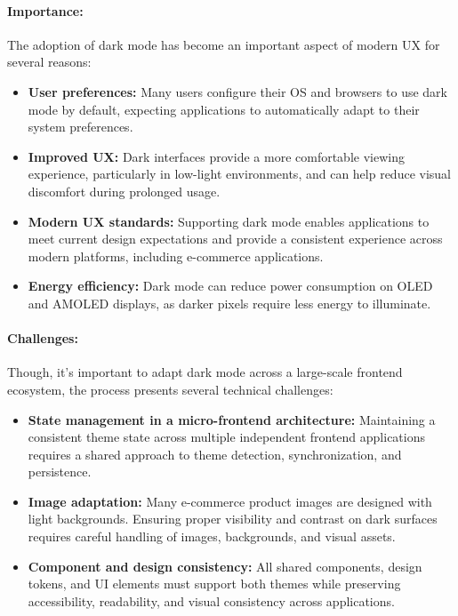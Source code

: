 \paragraph{Importance:}

The adoption of dark mode has become an important aspect of modern \acs{UX} for several reasons:

\begin{itemize}
    \item \textbf{User preferences:} Many users configure their \acs{OS} and browsers to use dark mode by default, expecting applications to automatically adapt to their system preferences.

    \item \textbf{Improved \acs{UX}:} Dark interfaces provide a more comfortable viewing experience, particularly in low-light environments, and can help reduce visual discomfort during prolonged usage.

    \item \textbf{Modern \acs{UX} standards:} Supporting dark mode enables applications to meet current design expectations and provide a consistent experience across modern platforms, including e-commerce applications.

    \item \textbf{Energy efficiency:} Dark mode can reduce power consumption on OLED and AMOLED displays, as darker pixels require less energy to illuminate.
\end{itemize}

\paragraph{Challenges:}

Though, it's important to adapt dark mode across a large-scale frontend ecosystem, the process presents several technical challenges:
\begin{itemize}
    \item \textbf{State management in a micro-frontend architecture:} Maintaining a consistent theme state across multiple independent frontend applications requires a shared approach to theme detection, synchronization, and persistence.
    
    \item \textbf{Image adaptation:} Many e-commerce product images are designed with light backgrounds. Ensuring proper visibility and contrast on dark surfaces requires careful handling of images, backgrounds, and visual assets.
    
    \item \textbf{Component and design consistency:} All shared components, design tokens, and UI elements must support both themes while preserving accessibility, readability, and visual consistency across applications.
\end{itemize}


